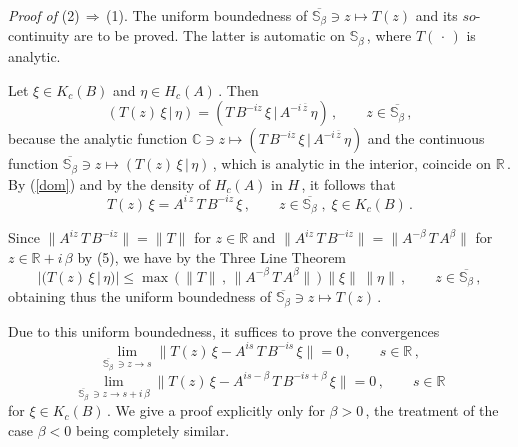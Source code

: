 \documentclass[reqno]{amsart}
\theoremstyle{definition}
\theoremstyle{remark}
\numberwithin{equation}{section}
\theoremstyle{plain}
\begin{document}
{\it Proof of }(2)$\,\Rightarrow\,$(1). The uniform boundedness of
$\overline{\mathbb S_\beta}\ni z\longmapsto T(z)$ and its
$so$-continuity are to be proved. The latter is automatic on
$\mathbb S_\beta\,$, where $T(\,\cdot\, )$ is analytic.

Let $\xi\in K_c(B)$ and $\eta\in H_c(A)\,$. Then
\begin{equation*}
(T(z)\,\xi\, |\,\eta ) =(T\, B^{-iz}\,\xi\, |\, A^{-i\,\overline z}\,
\eta )\, ,\qquad z\in \overline{\mathbb S_\beta}\, ,
\end{equation*}
because the analytic function $\mathbb C\ni z\longmapsto
(T\, B^{-iz}\,\xi\, |\, A^{-i\,\overline z}\,\eta )$ and the
continuous function $\overline{\mathbb S_\beta}\ni z\longmapsto
(T(z)\,\xi\, |\,\eta )\,$, which is analytic in the interior,
coincide on $\mathbb R\,$. By (\ref{dom}) and by the density of
$H_c(A)$ in $H\,$, it follows that
\begin{equation}\label{expl}
T(z)\,\xi =A^{i\, z}\,T\, B^{-iz}\,\xi\, ,\qquad
z\in \overline{\mathbb S_\beta}\; ,\;\xi\in K_c(B)\, .
\end{equation}

Since $\| A^{iz}\, T\, B^{-iz}\| =\| T\|$ for $z\in\mathbb R$ and
$\| A^{iz}\, T\, B^{-iz}\| =\| A^{-\beta}\, T\, A^\beta\|$ for
$z\in\mathbb R +i\,\beta$ by (5), we have by the Three Line Theorem
\begin{equation*}
|(T(z)\,\xi\, |\,\eta )|\leq\max\,\big(\,\| T\|\, ,\,\| A^{-\beta}\,
T\, A^\beta\|\,\big)\,\|\xi\|\,\|\eta\|\, ,\qquad z\in
\overline{\mathbb S_\beta}\, ,
\end{equation*}
obtaining thus the uniform boundedness of $\overline{\mathbb S_\beta}\ni
z\longmapsto T(z)\,$.

Due to this uniform boundedness, it suffices to prove the convergences
\begin{equation}\label{str.op.1}
\lim_{\overline{\mathbb S_\beta}\,\ni z\to s} \| T(z)\,\xi -
A^{is}\, T\, B^{-is}\,\xi\| =0\, ,\qquad s\in\mathbb R\, ,
\end{equation}
\begin{equation}\label{str.op.2}
\lim_{\overline{\mathbb S_\beta}\,\ni z\to s+i\,\beta} \| T(z)\,\xi -
A^{is-\beta}\, T\, B^{-is+\beta}\,\xi\| =0\, ,\qquad s\in\mathbb R
\end{equation}
for $\xi\in K_c(B)\,$. We give a proof explicitly only for
$\beta >0\,$, the treatment of the case $\beta <0$ being completely
similar.
\end{document}
